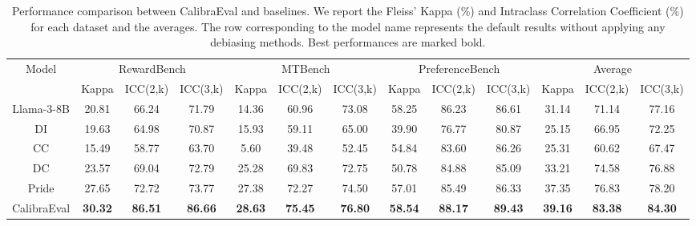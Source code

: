 \documentclass[sigconf]{acmart}
\begin{document}
\begin{table}[]
\caption{Performance comparison between CalibraEval and baselines. We report the Fleiss' Kappa (\%) and Intraclass Correlation Coefficient (\%) for each dataset and the averages. The row corresponding to the model name represents the default results without applying any debiasing methods. Best performances are marked bold.}
\begin{tabular}{c|ccc|ccc|ccc|ccc}
\hline
\multirow{2}{*}{Model} & \multicolumn{3}{c|}{RewardBench}                 & \multicolumn{3}{c|}{MTBench}                     & \multicolumn{3}{c|}{PreferenceBench}            & \multicolumn{3}{c}{Average}                      \\
                       & Kappa          & ICC(2,k)       & ICC(3,k)       & Kappa          & ICC(2,k)       & ICC(3,k)       & Kappa          & ICC(2,k)       & ICC(3,k)       & Kappa          & ICC(2,k)       & ICC(3,k)       \\ \hline
Llama-3-8B             & 20.81          & 66.24          & 71.79          & 14.36          & 60.96          & 73.08          & 58.25          & 86.23          & 86.61          & 31.14          & 71.14          & 77.16          \\
DI                     & 19.63          & 64.98          & 70.87          & 15.93          & 59.11          & 65.00          & 39.90          & 76.77          & 80.87          & 25.15          & 66.95          & 72.25          \\
CC                     & 15.49          & 58.77          & 63.70          & 5.60           & 39.48          & 52.45          & 54.84          & 83.60          & 86.26          & 25.31          & 60.62          & 67.47          \\
DC                     & 23.57          & 69.04          & 72.79          & 25.28          & 69.83          & 72.75          & 50.78          & 84.88          & 85.09          & 33.21          & 74.58          & 76.88          \\
Pride                  & 27.65          & 72.72          & 73.77          & 27.38          & 72.27          & 74.50          & 57.01          & 85.49          & 86.33          & 37.35          & 76.83          & 78.20          \\
CalibraEval            & \textbf{30.32} & \textbf{86.51} & \textbf{86.66} & \textbf{28.63} & \textbf{75.45} & \textbf{76.80} & \textbf{58.54} & \textbf{88.17} & \textbf{89.43} & \textbf{39.16} & \textbf{83.38} & \textbf{84.30} \\ \hline

\end{tabular}
\end{table}
\end{document}
